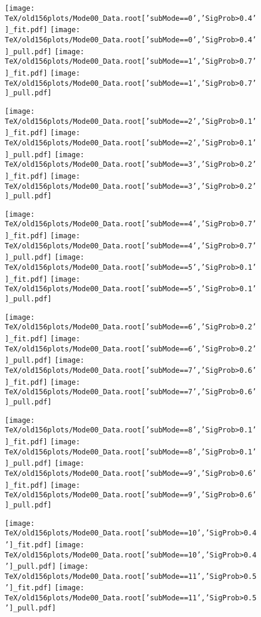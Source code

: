 \documentclass{article}
\begin{document}
\begin{figure}[p!]
\begin{center}
\texttt{[image: TeX/old156plots/Mode00\_Data.root['subMode==0','SigProb>0.4']\_fit.pdf]}
\texttt{[image: TeX/old156plots/Mode00\_Data.root['subMode==0','SigProb>0.4']\_pull.pdf]}
\texttt{[image: TeX/old156plots/Mode00\_Data.root['subMode==1','SigProb>0.7']\_fit.pdf]}
\texttt{[image: TeX/old156plots/Mode00\_Data.root['subMode==1','SigProb>0.7']\_pull.pdf]}

\texttt{[image: TeX/old156plots/Mode00\_Data.root['subMode==2','SigProb>0.1']\_fit.pdf]}
\texttt{[image: TeX/old156plots/Mode00\_Data.root['subMode==2','SigProb>0.1']\_pull.pdf]}
\texttt{[image: TeX/old156plots/Mode00\_Data.root['subMode==3','SigProb>0.2']\_fit.pdf]}
\texttt{[image: TeX/old156plots/Mode00\_Data.root['subMode==3','SigProb>0.2']\_pull.pdf]}

\texttt{[image: TeX/old156plots/Mode00\_Data.root['subMode==4','SigProb>0.7']\_fit.pdf]}
\texttt{[image: TeX/old156plots/Mode00\_Data.root['subMode==4','SigProb>0.7']\_pull.pdf]}
\texttt{[image: TeX/old156plots/Mode00\_Data.root['subMode==5','SigProb>0.1']\_fit.pdf]}
\texttt{[image: TeX/old156plots/Mode00\_Data.root['subMode==5','SigProb>0.1']\_pull.pdf]}

\texttt{[image: TeX/old156plots/Mode00\_Data.root['subMode==6','SigProb>0.2']\_fit.pdf]}
\texttt{[image: TeX/old156plots/Mode00\_Data.root['subMode==6','SigProb>0.2']\_pull.pdf]}
\texttt{[image: TeX/old156plots/Mode00\_Data.root['subMode==7','SigProb>0.6']\_fit.pdf]}
\texttt{[image: TeX/old156plots/Mode00\_Data.root['subMode==7','SigProb>0.6']\_pull.pdf]}

\texttt{[image: TeX/old156plots/Mode00\_Data.root['subMode==8','SigProb>0.1']\_fit.pdf]}
\texttt{[image: TeX/old156plots/Mode00\_Data.root['subMode==8','SigProb>0.1']\_pull.pdf]}
\texttt{[image: TeX/old156plots/Mode00\_Data.root['subMode==9','SigProb>0.6']\_fit.pdf]}
\texttt{[image: TeX/old156plots/Mode00\_Data.root['subMode==9','SigProb>0.6']\_pull.pdf]}

\texttt{[image: TeX/old156plots/Mode00\_Data.root['subMode==10','SigProb>0.4']\_fit.pdf]}
\texttt{[image: TeX/old156plots/Mode00\_Data.root['subMode==10','SigProb>0.4']\_pull.pdf]}
\texttt{[image: TeX/old156plots/Mode00\_Data.root['subMode==11','SigProb>0.5']\_fit.pdf]}
\texttt{[image: TeX/old156plots/Mode00\_Data.root['subMode==11','SigProb>0.5']\_pull.pdf]}


\end{center}
\end{figure}
\end{document}
